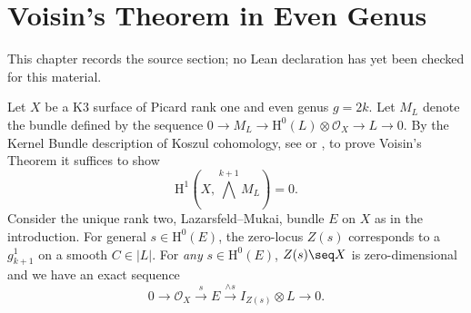 \chapter{Voisin's Theorem in Even Genus}
\label{universal-secant-bundles-syzygies-canonical-curves-chapter-02}

\begin{remark}
\label{universal-secant-bundles-syzygies-canonical-curves-chapter-02-source}
This chapter records the source section; no Lean declaration has yet been checked for this material.
\notready
\end{remark}

\label{sec1}
Let $X$ be a K3 surface of Picard rank one and even genus $g=2k$. Let $M_L$ denote the bundle defined by the sequence $0 \to M_L \to \mathrm{H}^0(L)\otimes \mathcal{O}_X \to L \to 0.$
By the Kernel Bundle description of Koszul cohomology, see \cite{lazarsfeld-VBT} or \cite[\S 3]{ein-lazarsfeld-asymptotic}, to prove Voisin's Theorem it suffices to show $$\mathrm{H}^1(X, \bigwedge^{k+1} M_L )=0.$$
Consider the unique rank two, Lazarsfeld--Mukai, bundle $E$ on $X$ as in the introduction. For general $s \in \mathrm{H}^0(E)$, the zero-locus $Z(s)$ corresponds to a $g^1_{k+1}$ on a smooth $C \in |L|$.
For \emph{any} $s \in \mathrm{H}^0(E)$, $Z(s) \seq X$ is zero-dimensional and we have an exact sequence $$0 \to \mathcal{O}_X \xrightarrow{s} E \xrightarrow{\wedge s} I_{Z(s)} \otimes L \to 0.$$

